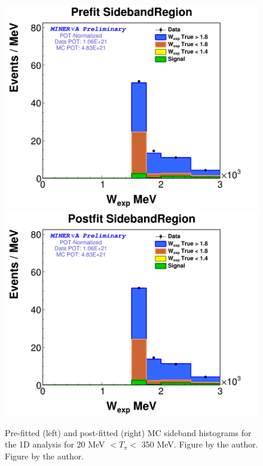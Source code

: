 \begin{figure}
    \centering
    \includegraphics[scale=0.2]{Figures/Chapter4/BGStudies/PreWFit_wexp_fit_1Pi_PN_SidebandRegion_thetapi.png}
    \includegraphics[scale=0.2]{Figures/Chapter4/BGStudies/PostWFit_wexp_fit_1Pi_PN_SidebandRegion_thetapi.png}
    \caption{Pre-fitted (left) and post-fitted (right) MC sideband histograms for the 1D analysis for 20 MeV $ <T_\pi <$ 350 MeV. Figure by the author. Figure by the author.}
    \label{fig:BgStudies:SidebandTunning:PrePosFit1DAnalysisthetapi}
\end{figure}

